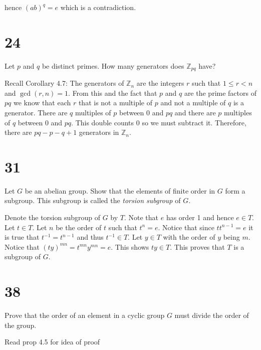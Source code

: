 \documentclass[a4paper]{article}
\begin{document}
hence $(ab)^q = e$ which is a contradiction. 



\section*{24}

Let $p$ and $q$ be distinct primes. How many generators does $\mathbb{Z}_{pq}$ have?

\vspace{\baselineskip}

Recall Corollary 4.7: The generators of $\mathbb{Z}_n$ are the integers $r$ such that $1 \leq r < n$ and $\gcd(r,n) = 1$. From this and the fact that $p$ and $q$ are the prime factors of $pq$ we know that each $r$ that is not a multiple of $p$ and not a multiple of $q$ is a generator. There are $q$ multiples of $p$ between 0 and $pq$ and there are $p$ multiples of $q$ between 0 and $pq$. This double counts 0 so we must subtract it. Therefore, there are $pq - p - q + 1$ generators in $\mathbb{Z}_n$.


\section*{31}


Let $G$ be an abelian group. Show that the elements of finite order in $G$ form a subgroup. This subgroup is called the \textit{torsion subgroup} of $G$.

\vspace{\baselineskip}

Denote the torsion subgroup of $G$ by $T$. Note that $e$ has order 1 and hence $e \in T$. Let $t \in T$. Let $n$ be the order of $t$ such that $t^n = e$. Notice that since $tt^{n-1} = e$ it is true that $t^{-1} = t^{n-1}$ and thus $t^{-1} \in T$. Let $y \in T$ with the order of $y$ being $m$. Notice that $(ty)^{mn} = t^{mn}y^{mn} = e$. This shows $ty \in T$. This proves that $T$ is a subgroup of $G$. 


\section*{38}

Prove that the order of an element in a cyclic group $G$ must divide the order of the group.

\vspace{\baselineskip}

Read prop 4.5 for idea of proof
\end{document}
